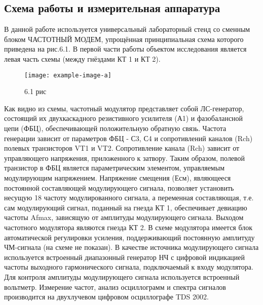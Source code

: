 ﻿\documentclass[a4paper,12pt]{article}
\begin{document}
\subsection{Схема работы и измерительная аппаратура}
В данной работе используется универсальный лабораторный стенд со сменным блоком ЧАСТОТНЫЙ МОДЕМ, упрощённая принципиальная схема которого приведена на рис.6.1. В первой части работы объектом исследования является левая часть схемы (между гнёздами КТ 1 и КТ 2).
\begin{figure}[H]
	\centering
	\texttt{[image: example-image-a]}
	\caption{6.1 рис}
\end{figure}
Как видно из схемы, частотный модулятор представляет собой ЛС-генератор, состоящий их двухкаскадного резистивного усилителя (А1) и фазобалансной цепи (ФБЦ), обеспечивающей положительную обратную связь. Частота генерации зависит от параметров ФБЦ - С3, С4 и сопротивлений каналов (Rch) полевых транзисторов VT1 и VT2. Сопротивление канала (Rch) зависит от управляющего напряжения, приложенного к затвору. Таким образом, полевой транзистор в ФБЦ является параметрическим элементом, управляемым модулирующим напряжением. Напряжение смещения (Есм), являющееся постоянной составляющей модулирующего сигнала, позволяет установить несущую
18
частоту модулированного сигнала, а переменная составляющая, т.е. сам модулирующий сигнал, поданный на гнезда КТ 1, обеспечивает девиацию частоты Afmax, зависящую от амплитуды модулирующего сигнала. Выходом частотного модулятора являются гнезда КТ 2.
В схеме модулятора имеется блок автоматической регулировки усиления, поддерживающий постоянную амплитуду ЧМ-сигнала (на схеме не показан).
В качестве источника модулирующего сигнала используется встроенный диапазонный генератор НЧ с цифровой индикацией частоты выходного гармонического сигнала, подключаемый к входу модулятора. Для контроля амплитуды модулирующего сигнала используется встроенный вольтметр. Измерение частот, анализ осциллограмм и спектра сигналов производится на двухлучевом цифровом осциллографе TDS 2002.
\end{document}
